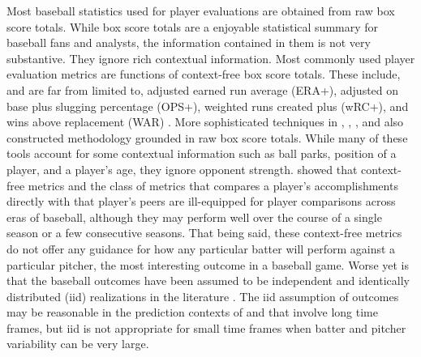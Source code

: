 \documentclass[11pt]{article}
\begin{document}
Most baseball statistics used for player evaluations are obtained from raw box score totals. While box score totals are a enjoyable statistical summary for baseball fans and analysts, the information contained in them is not very substantive. They ignore rich contextual information. Most commonly used player evaluation metrics are functions of context-free box score totals. These include, and are far from limited to, adjusted earned run average (ERA+), adjusted on base plus slugging percentage (OPS+), weighted runs created plus (wRC+), and wins above replacement (WAR) \citep{bref, fangraphs}. More sophisticated techniques in \citet{berry1999bridging}, \citet{brown2008season}, \cite{jensen2009hierarchical}, and \cite{baumer2015openwar} also constructed methodology grounded in raw box score totals. While many of these tools account for some contextual information such as ball parks, position of a player, and a player's age, they ignore opponent strength. %
\cite{eck2020challenging} showed that context-free metrics and the class of metrics that compares a player's accomplishments directly with that player's peers are ill-equipped for player comparisons across eras of baseball, although they may perform well over the course of a single season or a few consecutive seasons. That being said, these context-free metrics do not offer any guidance for how any particular batter will perform against a particular pitcher, the most interesting outcome in a baseball game. Worse yet is that the baseball outcomes have been assumed to be independent and identically distributed (iid) realizations in the literature \citep{brown2008season, jensen2009hierarchical}. The iid assumption of outcomes may be reasonable in the prediction contexts of \cite{brown2008season} and \cite{jensen2009hierarchical} that involve long time frames, but iid is not appropriate for small time frames when batter and pitcher variability can be very large.




%
\end{document}
